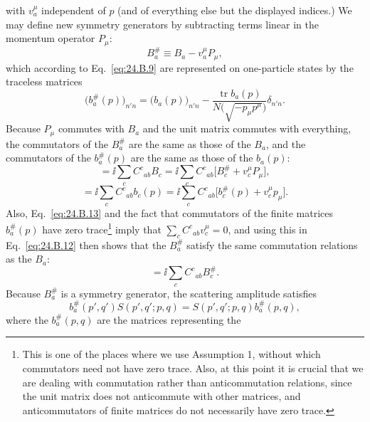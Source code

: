 with $v_a^\mu$ independent of $p$ (and of everything else but the
displayed indices.) We may define new symmetry generators by subtracting terms
linear in the momentum operator $P_\mu$:
\begin{equation}
 B_a^\#\equiv B_a-v_a^\mu P_\mu,
\tag{24.B.10}\label{eq:24.B.10}
\end{equation}
which according to Eq.~\eqref{eq:24.B.9} are represented on one-particle
states by the traceless matrices
\begin{equation}
 \bigl(b_a^\#(p)\bigr)_{n'n}
 =\bigl(b_a(p)\bigr)_{n'n}
 -\frac{\operatorname{tr}b_a(p)}
 {N\bigl(\sqrt{-p_\mu p^\mu}\bigr)}\delta_{n'n}.
\tag{24.B.11}\label{eq:24.B.11}
\end{equation}
Because $P_\mu$ commutes with $B_a$ and the unit matrix commutes with
everything, the commutators of the $B_a^\#$ are the same as those of the
$B_a$, and the commutators of the $b_a^\#(p)$ are the same as those
of the $b_a(p)$:
\begin{equation}
 [B_a^\#,B_b^\#]
 =\ii\sum_c C^c{}_{ab}B_c
 =\ii\sum_c C^c{}_{ab}
 \bigl[B_c^\#+v_c^\mu P_\mu\bigr],
\tag{24.B.12}\label{eq:24.B.12}
\end{equation}
\begin{equation}
 [b_a^\#(p),b_b^\#(p)]
 =\ii\sum_c C^c{}_{ab}b_c(p)
 =\ii\sum_c C^c{}_{ab}
 \bigl[b_c^\#(p)+v_c^\mu p_\mu\bigr].
\tag{24.B.13}\label{eq:24.B.13}
\end{equation}
Also, Eq.~\eqref{eq:24.B.13} and the fact that commutators of the finite
matrices $b_a^\#(p)$ have zero trace\footnote{This is one of the places
where we use Assumption 1, without which commutators need not have zero trace.
Also, at this point it is crucial that we are dealing with commutation rather
than anticommutation relations, since the unit matrix does not anticommute with
other matrices, and anticommutators of finite matrices do not necessarily have
zero trace.} imply that
$\sum_c C^c{}_{ab}v_c^\mu=0$, and using this in
Eq.~\eqref{eq:24.B.12} then shows that the $B_a^\#$ satisfy the same
commutation relations as the $B_a$:
\begin{equation}
 [B_a^\#,B_b^\#]
 =\ii\sum_c C^c{}_{ab}B_c^\#.
\tag{24.B.14}\label{eq:24.B.14}
\end{equation}
Because $B_a^\#$ is a symmetry generator, the scattering amplitude
satisfies
\begin{equation}
 b_a^\#(p',q')S(p',q';p,q)
 =S(p',q';p,q)b_a^\#(p,q),
\tag{24.B.15}\label{eq:24.B.15}
\end{equation}
where the $b_a^\#(p,q)$ are the matrices representing the

